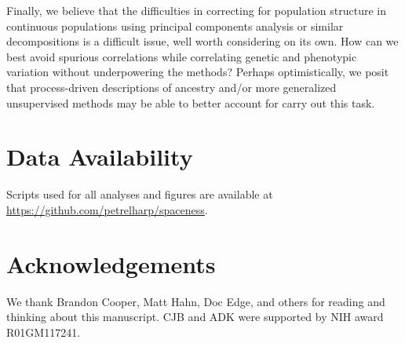 \documentclass[10pt,twoside,lineno,hidelinks]{preprint}
\begin{document}

Finally, we believe that the difficulties in correcting for population structure in continuous populations 
using principal components analysis or similar decompositions is a difficult issue, well worth considering on its own.
How can we best avoid spurious correlations while correlating genetic and phenotypic variation 
without underpowering the methods?
Perhaps optimistically,
we posit that process-driven descriptions of ancestry 
and/or more generalized unsupervised methods may be able to better account for carry out this task.


\section{Data Availability}
Scripts used for all analyses and figures are available at \url{https://github.com/petrelharp/spaceness}. 

\section{Acknowledgements}
We thank Brandon Cooper, Matt Hahn, Doc Edge, and others for reading and thinking about this manuscript. 
CJB and ADK were supported by NIH award R01GM117241. 





\appendix
\setcounter{table}{0}
\renewcommand{\thetable}{A\arabic{table}}%
\setcounter{figure}{0}
\renewcommand{\thefigure}{A\arabic{figure}}%
\end{document}
